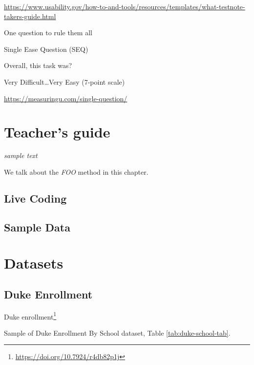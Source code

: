 \documentclass[
]{krantz}
\renewcommand{\href}[2]{#2\footnote{\url{#1}}}
\begin{document}
\url{https://www.usability.gov/how-to-and-tools/resources/templates/what-testnote-takers-guide.html}

One question to rule them all

Single Ease Question (SEQ)

Overall, this task was?

Very Difficult\ldots Very Easy
(7-point scale)

\url{https://measuringu.com/single-question/}

\hypertarget{teachers-guide}{%
\chapter{Teacher's guide}\label{teachers-guide}}

\emph{sample text}

We talk about the \emph{FOO} method in this chapter.

\hypertarget{live-coding}{%
\section{Live Coding}\label{live-coding}}

\hypertarget{sample-data}{%
\section{Sample Data}\label{sample-data}}

\cleardoublepage

\hypertarget{appendix-appendix}{%
\appendix {}}


\hypertarget{datasets}{%
\chapter{Datasets}\label{datasets}}

\hypertarget{duke-enrollment}{%
\section*{Duke Enrollment}\label{duke-enrollment}}


\href{https://doi.org/10.7924/r4db82p1j}{Duke enrollment}

Sample of Duke Enrollment By School dataset, Table \ref{tab:duke-school-tab}.
\end{document}

